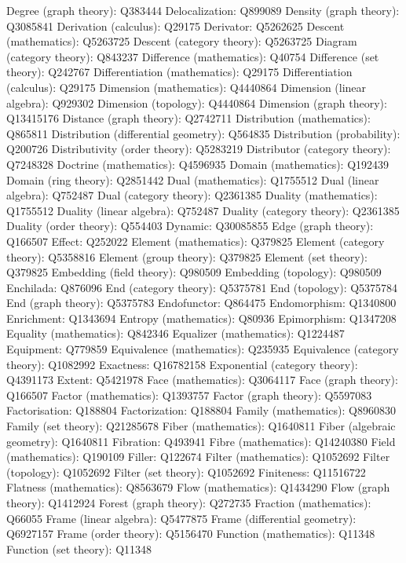 Degree (graph theory): Q383444
Delocalization: Q899089
Density (graph theory): Q3085841
Derivation (calculus): Q29175
Derivator: Q5262625
Descent (mathematics): Q5263725
Descent (category theory): Q5263725
Diagram (category theory): Q843237
Difference (mathematics): Q40754
Difference (set theory): Q242767
Differentiation (mathematics): Q29175
Differentiation (calculus): Q29175
Dimension (mathematics): Q4440864
Dimension (linear algebra): Q929302
Dimension (topology): Q4440864
Dimension (graph theory): Q13415176
Distance (graph theory): Q2742711
Distribution (mathematics): Q865811
Distribution (differential geometry): Q564835
Distribution (probability): Q200726
Distributivity (order theory): Q5283219
Distributor (category theory): Q7248328
Doctrine (mathematics): Q4596935
Domain (mathematics): Q192439
Domain (ring theory): Q2851442
Dual (mathematics): Q1755512
Dual (linear algebra): Q752487
Dual (category theory): Q2361385
Duality (mathematics): Q1755512
Duality (linear algebra): Q752487
Duality (category theory): Q2361385
Duality (order theory): Q554403
Dynamic: Q30085855
Edge (graph theory): Q166507
Effect: Q252022
Element (mathematics): Q379825
Element (category theory): Q5358816
Element (group theory): Q379825
Element (set theory): Q379825
Embedding (field theory): Q980509
Embedding (topology): Q980509
Enchilada: Q876096
End (category theory): Q5375781
End (topology): Q5375784
End (graph theory): Q5375783
Endofunctor: Q864475
Endomorphism: Q1340800
Enrichment: Q1343694
Entropy (mathematics): Q80936
Epimorphism: Q1347208
Equality (mathematics): Q842346
Equalizer (mathematics): Q1224487
Equipment: Q779859
Equivalence (mathematics): Q235935
Equivalence (category theory): Q1082992
Exactness: Q16782158
Exponential (category theory): Q4391173
Extent: Q5421978
Face (mathematics): Q3064117
Face (graph theory): Q166507
Factor (mathematics): Q1393757
Factor (graph theory): Q5597083
Factorisation: Q188804
Factorization: Q188804
Family (mathematics): Q8960830
Family (set theory): Q21285678
Fiber (mathematics): Q1640811
Fiber (algebraic geometry): Q1640811
Fibration: Q493941
Fibre (mathematics): Q14240380
Field (mathematics): Q190109
Filler: Q122674
Filter (mathematics): Q1052692
Filter (topology): Q1052692
Filter (set theory): Q1052692
Finiteness: Q11516722
Flatness (mathematics): Q8563679
Flow (mathematics): Q1434290
Flow (graph theory): Q1412924
Forest (graph theory): Q272735
Fraction (mathematics): Q66055
Frame (linear algebra): Q5477875
Frame (differential geometry): Q6927157
Frame (order theory): Q5156470
Function (mathematics): Q11348
Function (set theory): Q11348
